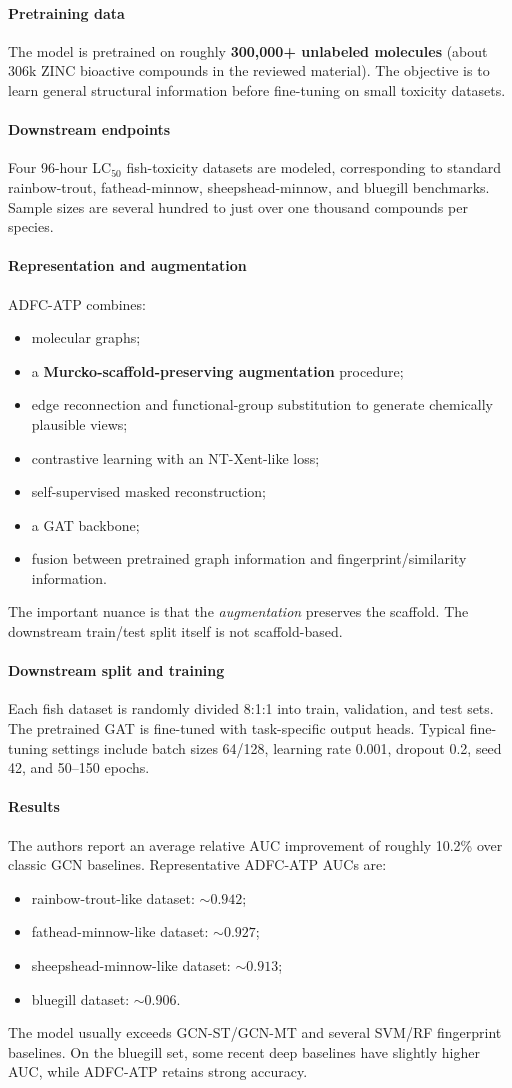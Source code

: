 \documentclass[11pt]{article}
\newcommand{\reviewfield}[2]{\paragraph{#1}#2}
\begin{document}
\reviewfield{Pretraining data}{
The model is pretrained on roughly \textbf{300,000+ unlabeled molecules} (about 306k ZINC bioactive compounds in the reviewed material). The objective is to learn general structural information before fine-tuning on small toxicity datasets.
}

\reviewfield{Downstream endpoints}{
Four 96-hour LC$_{50}$ fish-toxicity datasets are modeled, corresponding to standard rainbow-trout, fathead-minnow, sheepshead-minnow, and bluegill benchmarks. Sample sizes are several hundred to just over one thousand compounds per species.
}

\reviewfield{Representation and augmentation}{
ADFC-ATP combines:
\begin{itemize}
    \item molecular graphs;
    \item a \textbf{Murcko-scaffold-preserving augmentation} procedure;
    \item edge reconnection and functional-group substitution to generate chemically plausible views;
    \item contrastive learning with an NT-Xent-like loss;
    \item self-supervised masked reconstruction;
    \item a GAT backbone;
    \item fusion between pretrained graph information and fingerprint/similarity information.
\end{itemize}

The important nuance is that the \emph{augmentation} preserves the scaffold. The downstream train/test split itself is not scaffold-based.
}

\reviewfield{Downstream split and training}{
Each fish dataset is randomly divided 8:1:1 into train, validation, and test sets. The pretrained GAT is fine-tuned with task-specific output heads. Typical fine-tuning settings include batch sizes 64/128, learning rate 0.001, dropout 0.2, seed 42, and 50--150 epochs.
}

\reviewfield{Results}{
The authors report an average relative AUC improvement of roughly 10.2\% over classic GCN baselines. Representative ADFC-ATP AUCs are:
\begin{itemize}
    \item rainbow-trout-like dataset: $\sim0.942$;
    \item fathead-minnow-like dataset: $\sim0.927$;
    \item sheepshead-minnow-like dataset: $\sim0.913$;
    \item bluegill dataset: $\sim0.906$.
\end{itemize}
The model usually exceeds GCN-ST/GCN-MT and several SVM/RF fingerprint baselines. On the bluegill set, some recent deep baselines have slightly higher AUC, while ADFC-ATP retains strong accuracy.
}
\end{document}
